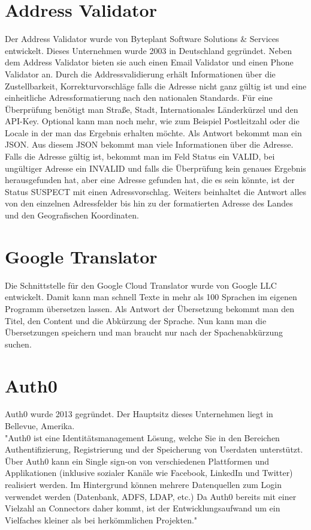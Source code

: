 \section{Address Validator}
Der Address Validator wurde von Byteplant Software Solutions \& Services entwickelt. Dieses Unternehmen wurde 2003 in Deutschland gegründet. Neben dem Address Validator bieten sie auch einen Email Validator und einen Phone Validator an. Durch die Addressvalidierung erhält Informationen über die Zustellbarkeit, Korrekturvorschläge falls die Adresse nicht ganz gültig ist und eine einheitliche Adressformatierung nach den nationalen Standards. Für eine Überprüfung benötigt man Straße, Stadt, Internationales Länderkürzel und den API-Key. Optional kann man noch mehr, wie zum Beispiel Postleitzahl oder die Locale in der man das Ergebnis erhalten möchte. 
Als Antwort bekommt man ein JSON. Aus diesem JSON bekommt man viele Informationen über die Adresse. Falls die Adresse gültig ist, bekommt man im Feld Status ein VALID, bei ungültiger Adresse ein INVALID und falls die Überprüfung kein genaues Ergebnis herausgefunden hat, aber eine Adresse gefunden hat, die es sein könnte, ist der Status SUSPECT mit einen Adressvorschlag. Weiters beinhaltet die Antwort alles von den einzelnen Adressfelder bis hin zu der formatierten Adresse des Landes und den Geografischen Koordinaten. \cite{addressValidator}

\section{Google Translator}
Die Schnittstelle für den Google Cloud Translator wurde von Google LLC entwickelt. Damit kann man schnell Texte in mehr als 100 Sprachen im eigenen Programm übersetzen lassen. Als Antwort der Übersetzung bekommt man den Titel, den Content und die Abkürzung der Sprache. Nun kann man die Übersetzungen speichern und man braucht nur nach der Spachenabkürzung suchen.
\cite{googleTranslator}

\section{Auth0}
Auth0 wurde 2013 gegründet. Der Hauptsitz dieses Unternehmen liegt in Bellevue, Amerika.\\
"Auth0 ist eine Identitätsmanagement Lösung, welche Sie in den Bereichen Authentifizierung, Registrierung und der Speicherung von Userdaten unterstützt. Über Auth0 kann ein Single sign-on von verschiedenen Plattformen und Applikationen (inklusive sozialer Kanäle wie Facebook, LinkedIn und Twitter) realisiert werden. Im Hintergrund können mehrere Datenquellen zum Login verwendet werden (Datenbank, ADFS, LDAP, etc.) Da Auth0 bereits mit einer Vielzahl an Connectors daher kommt, ist der Entwicklungsaufwand um ein Vielfaches kleiner als bei herkömmlichen Projekten." \autocite{auth0}

